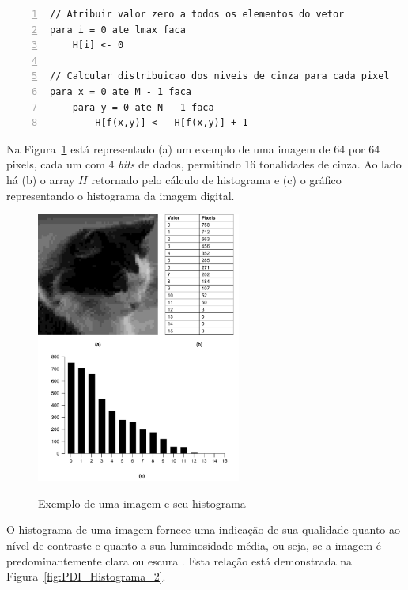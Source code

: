 \documentclass[12pt,oneside,a4paper,english,french,spanish,brazil,]{abntex2}
\begin{document}
\begin{minipage}{\linewidth}
\begin{lstlisting}[caption={Cálculo do histograma de uma imagem em tons de cinza}, label=alg:Histograma, numbers=left]
// Atribuir valor zero a todos os elementos do vetor
para i = 0 ate lmax faca
    H[i] <- 0
    
// Calcular distribuicao dos niveis de cinza para cada pixel
para x = 0 ate M - 1 faca
    para y = 0 ate N - 1 faca
        H[f(x,y)] <-  H[f(x,y)] + 1
\end{lstlisting}
\end{minipage}

Na Figura~\ref{fig:PDI_Histograma} está representado (a) um exemplo de uma imagem de 64 por 64 pixels, cada um com 4 \textit{bits} de dados, permitindo 16 tonalidades de cinza. Ao lado há (b) o array \(H\) retornado pelo cálculo de histograma e (c) o gráfico representando o histograma da imagem digital.

\begin{figure}[ht]
\centering
\caption{Exemplo de uma imagem e seu histograma}
\includegraphics[width=0.6\textwidth]{imagens/PDI_Histograma.pdf}
\sourceAuthor
\label{fig:PDI_Histograma}
\end{figure}

O histograma de uma imagem fornece uma indicação de sua qualidade quanto ao nível de contraste e quanto a sua luminosidade média, ou seja, se a imagem é predominantemente clara ou escura \cite{conci:2003}. Esta relação está demonstrada na Figura~\ref{fig:PDI_Histograma_2}.
\end{document}
